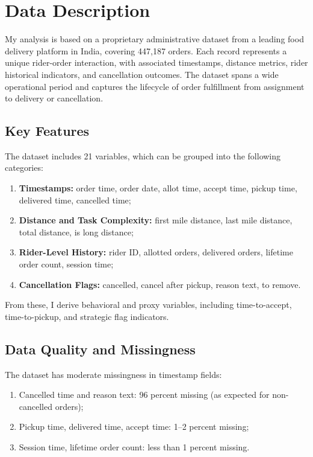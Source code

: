 \documentclass[12pt,letterpaper]{article}
\begin{document}
\section{Data Description}

My analysis is based on a proprietary administrative dataset from a leading food delivery platform in India, covering 447,187 orders. Each record represents a unique rider-order interaction, with associated timestamps, distance metrics, rider historical indicators, and cancellation outcomes. The dataset spans a wide operational period and captures the lifecycle of order fulfillment from assignment to delivery or cancellation.

\subsection{Key Features}

The dataset includes 21 variables, which can be grouped into the following categories:
\begin{enumerate}
    \item \textbf{Timestamps:} order time, order date, allot time, accept time, pickup time, delivered time, cancelled time;
    \item \textbf{Distance and Task Complexity:} first mile distance, last mile distance, total distance, is long distance;
    \item \textbf{Rider-Level History:} rider ID, allotted orders, delivered orders, lifetime order count, session time;
    \item \textbf{Cancellation Flags:} cancelled, cancel after pickup, reason text, to remove.
\end{enumerate}

From these, I derive behavioral and proxy variables, including time-to-accept, time-to-pickup, and strategic flag indicators.

\subsection{Data Quality and Missingness}

The dataset has moderate missingness in timestamp fields:
\begin{enumerate}
    \item Cancelled time and reason text: 96 percent missing (as expected for non-cancelled orders);
    \item Pickup time, delivered time, accept time: 1--2 percent missing;
    \item Session time, lifetime order count: less than 1 percent missing.
\end{enumerate}
\end{document}
